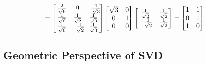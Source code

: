 \begin{solution}
\begin{align*}
&= 
\left[\begin{array}{@{\,}wc{13pt}wc{13pt}wc{13pt}@{\,}}
\frac{2}{\sqrt{6}} & 0 & -\frac{1}{\sqrt{3}} \\
\frac{1}{\sqrt{6}} & \frac{1}{\sqrt{2}} & \frac{1}{\sqrt{3}}\\
\frac{1}{\sqrt{6}} & -\frac{1}{\sqrt{2}} & \frac{1}{\sqrt{3}}
\end{array}\right]
\begin{bmatrix}
\sqrt{3} & 0 \\
0 & 1 \\
0 & 0
\end{bmatrix} 
\begin{bmatrix}
\frac{1}{\sqrt{2}} & \frac{1}{\sqrt{2}}\\
-\frac{1}{\sqrt{2}} & \frac{1}{\sqrt{2}}
\end{bmatrix}
=
\begin{bmatrix}
1 & 1 \\
0 & 1 \\
1 & 0
\end{bmatrix}
\end{align*}
\end{solution}

\subsection{Geometric Perspective of SVD}

